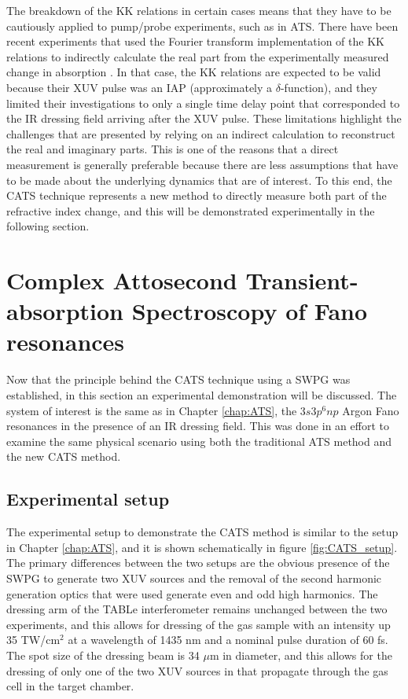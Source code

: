 The breakdown of the KK relations in certain cases means that they have to be cautiously applied to pump/probe experiments, such as in ATS.  There have been recent experiments that used the Fourier transform implementation of the KK relations \cite{petersonCausalityCalculationsTime1973} to indirectly calculate the real part from the experimentally measured change in absorption \cite{stoossRealTimeReconstructionStrongFieldDriven2018}.  In that case, the KK relations are expected to be valid because their XUV pulse was an IAP (approximately a $\delta$-function), and they limited their investigations to only a single time delay point that corresponded to the IR dressing field arriving after the XUV pulse.  These limitations highlight the challenges that are presented by relying on an indirect calculation to reconstruct the real and imaginary parts.  This is one of the reasons that a direct measurement is generally preferable because there are less assumptions that have to be made about the underlying dynamics that are of interest.  To this end, the CATS technique represents a new method to directly measure both part of the refractive index change, and this will be demonstrated experimentally in the following section.




\section{Complex Attosecond Transient-absorption Spectroscopy of Fano resonances}
\label{sec:CATS_ar}

Now that the principle behind the CATS technique using a SWPG was established, in this section an experimental demonstration will be discussed.  The system of interest is the same as in Chapter \ref{chap:ATS}, the $3s3p^6np$ Argon Fano resonances in the presence of an IR dressing field. This was done in an effort to examine the same physical scenario using both the traditional ATS method and the new CATS method.

\subsection{Experimental setup}
\label{sec:CATS_ar_exp_setup}

The experimental setup to demonstrate the CATS method is similar to the setup in Chapter \ref{chap:ATS}, and it is shown schematically in figure \ref{fig:CATS_setup}.  The primary differences between the two setups are the obvious presence of the SWPG to generate two XUV sources and the removal of the second harmonic generation optics that were used generate even and odd  high harmonics.  The dressing arm of the TABLe interferometer remains unchanged between the two experiments, and this allows for dressing of the gas sample with an intensity up 35 TW/cm$^2$ at a wavelength of 1435 nm and a nominal pulse duration of 60 fs. The spot size of the dressing beam is 34 $\mu$m in diameter, and this allows for the dressing of only one of the two XUV sources in that propagate through the gas cell in the target chamber.

